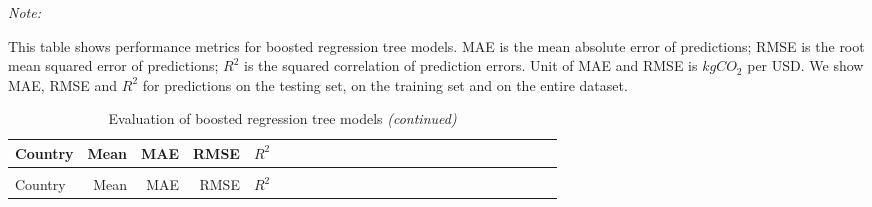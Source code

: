 \begingroup\fontsize{8}{10}\selectfont

\begin{ThreePartTable}
\begin{TableNotes}
\item \textit{Note: } 
\item This table shows performance metrics for boosted regression tree models. MAE is the mean absolute error of predictions; RMSE is the root mean squared error of predictions; $R^{2}$ is the squared correlation of prediction errors. Unit of MAE and RMSE is $kgCO_{2}$ per USD. We show MAE, RMSE and $R^{2}$ for predictions on the testing set, on the training set and on the entire dataset. 
\end{TableNotes}
\begin{longtable}[t]{l|r|rrrl|r|rrrl|r|rrrl|r|rrrl|r|rrr}
\caption{\label{tab:A8}Evaluation of boosted regression tree models}\\
\toprule
Country & Mean & MAE & RMSE & $R^{2}$\\
\midrule
\endfirsthead
\caption[]{Evaluation of boosted regression tree models \textit{(continued)}}\\
\toprule
Country & Mean & MAE & RMSE & $R^{2}$\\
\midrule
\endhead


\end{longtable}
\end{ThreePartTable}
